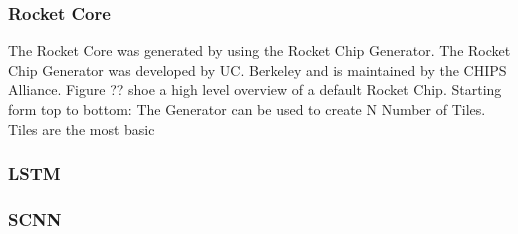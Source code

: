 \documentclass[../main.tex]{subfiles}
\begin{document}
\subsubsection{Rocket Core}
The Rocket Core was generated by using the Rocket Chip Generator. The Rocket Chip Generator was developed by UC. Berkeley and is maintained by the CHIPS Alliance. Figure ?? shoe a high level overview of a default Rocket Chip. Starting form top to bottom: The Generator can be used to create N Number of Tiles. Tiles are the most basic 
\subsubsection{LSTM}
\blindtext
\subsubsection{SCNN}
\blindtext
\end{document}
